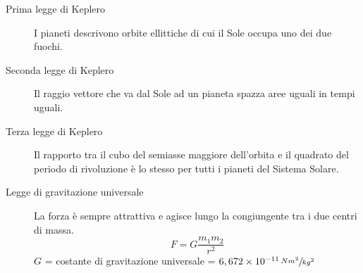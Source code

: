 \documentclass[a4paper,11pt,italian]{article}
\begin{document}
\begin{description}
  \item[Prima legge di Keplero]  
  I pianeti descrivono orbite ellittiche di cui il Sole occupa uno dei due fuochi.
  
  \item[Seconda legge di Keplero] 
  Il raggio vettore che va dal Sole ad un pianeta spazza aree uguali in tempi uguali.
  
  \item[Terza legge di Keplero] 
  Il rapporto tra il cubo del semiasse maggiore dell'orbita e il quadrato del periodo di rivoluzione è lo stesso per tutti i pianeti del Sistema Solare.
  
  \item[Legge di gravitazione universale] 
  La forza è sempre attrattiva e agisce lungo la congiungente tra i due centri di massa. 
  \[ F = G \frac{m_1 m_2}{r^2} \]
  $ G $ = costante di gravitazione universale = $ 6,672 \times 10^{-11} \, \sfrac{Nm^2}{kg^2} $
  
%   
%   
%   

%   
%   
  

\end{description}
\end{document}
